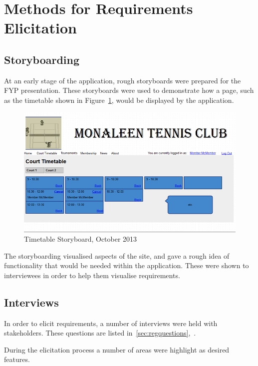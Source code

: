 \section{Methods for Requirements Elicitation}

\subsection{Storyboarding}

At an early stage of the application, rough storyboards were prepared for the FYP presentation. These storyboards were used to demonstrate how a page, such as the timetable shown in Figure~\ref{fig:timetableSB}, would be displayed by the application.

\begin{figure}[H]
\begin{center}
\includegraphics[width=14cm]{storyboard.png}
\end{center}
\caption{Timetable Storyboard, October 2013}
\label{fig:timetableSB}
\end{figure}

The storyboarding visualised aspects of the site, and gave a rough idea of functionality that would be needed within the application. These were shown to interviewees in order to help them visualise requirements.

\subsection{Interviews}

In order to elicit requirements, a number of interviews were held with stakeholders. These questions are listed in~\ref{sec:regquestions},~.

During the elicitation process a number of areas were highlight as desired features.

